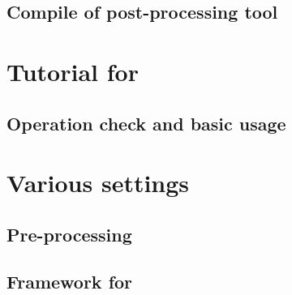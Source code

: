 \documentclass[a4paper]{report}
\begin{document}
 \chapter{Compile of post-processing tool}
 


\part{Tutorial for \scaledg}
 \chapter{Operation check and basic usage} \label{chap:tutorial_ideal}
 
 
 
 
 

%  
%  
%  
%  
%  
%  
%  


\part{Various settings} \label{part:basic_usel}

\chapter{Pre-processing}
 
 
%  

 \chapter{Framework for \scaledg}
%  
%  
 
%  
 
 
%  
%  
%  
%  
%  
\end{document}
